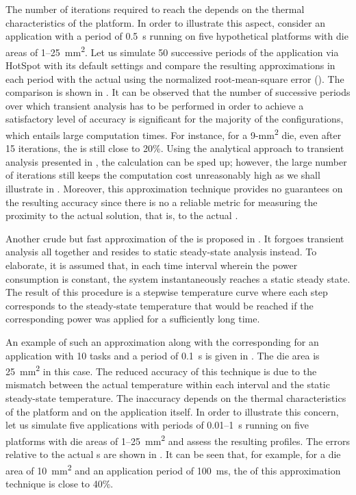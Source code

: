The number of iterations required to reach the  depends on the thermal
characteristics of the platform. In order to illustrate this aspect, consider an
application with a period of 0.5~s running on five hypothetical platforms with
die areas of 1--25~mm\textsuperscript{2}. Let us simulate 50 successive periods
of the application via HotSpot with its default settings and compare the
resulting approximations in each period with the actual  using the
normalized root-mean-square error (). The comparison is shown in
. It can be observed that the number of
successive periods over which transient analysis has to be performed in order to
achieve a satisfactory level of accuracy is significant for the majority of the
configurations, which entails large computation times. For instance, for a
9-mm\textsuperscript{2} die, even after 15 iterations, the  is still
close to 20\%. Using the analytical approach to transient analysis presented in
, the calculation can be sped up; however, the large
number of iterations still keeps the computation cost unreasonably high as we
shall illustrate in . Moreover, this
approximation technique provides no guarantees on the resulting accuracy since
there is no a reliable metric for measuring the proximity to the actual
solution, that is, to the actual .

Another crude but fast approximation of the  is proposed in
\cite{huang2009}. It forgoes transient analysis all together and resides to
static steady-state analysis instead. To elaborate, it is assumed that, in each
time interval wherein the power consumption is constant, the system
instantaneously reaches a static steady state. The result of this procedure is a
stepwise temperature curve where each step corresponds to the steady-state
temperature that would be reached if the corresponding power was applied for a
sufficiently long time.

An example of such an approximation along with the corresponding  for
an application with 10 tasks and a period of 0.1~s is given in
. The die area is 25~mm\textsuperscript{2} in
this case. The reduced accuracy of this technique is due to the mismatch between
the actual temperature within each interval and the static steady-state
temperature. The inaccuracy depends on the thermal characteristics of the
platform and on the application itself. In order to illustrate this concern, let
us simulate five applications with periods of 0.01--1~s running on five
platforms with die areas of 1--25~mm\textsuperscript{2} and assess the resulting
profiles. The errors relative to the actual s are shown in
. It can be seen that, for example, for a die
area of 10~mm\textsuperscript{2} and an application period of 100~ms, the
 of this approximation technique is close to 40\%.

